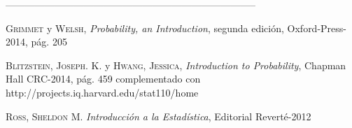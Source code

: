 \documentclass[10pt,a4paper]{article}
\theoremstyle{definition}
\theoremstyle{remark}
\begin{document}
\begin{center}
 -----------------------------------------------------------------------------
\end{center}
\begin{multicols}{2}
\begin{list}{}{\setlength{\topsep}{0mm}\setlength{\itemsep}{0mm}%
\setlength{\parsep}{0mm}\setlength{\leftmargin}{4mm}}
%
\small
\item[1.]  \textsc{Grimmet} y \textsc{Welsh},
	\textit{Probability, an Introduction}, segunda edición, Oxford-Press-2014, pág. 205
	
\item[2.] \textsc{Blitzstein, Joseph. K.} y \textsc{Hwang, Jessica},
	\textit{Introduction to Probability}, Chapman Hall CRC-2014, pág. 459 complementado con http://projects.iq.harvard.edu/stat110/home
	
\item[3.] \textsc{Ross, Sheldon M.}
	\textit{Introducción a la Estadística}, Editorial Reverté-2012

%
\end{list}
\end{multicols}
\end{document}

